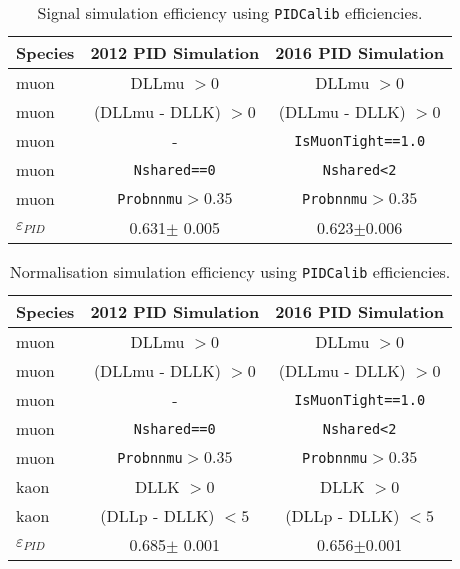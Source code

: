 \begin{table}[H]
\begin{center}
\begin{tabular}{l c c}\toprule

    Species  & 2012 PID Simulation & 2016 PID Simulation\\ \hline
    muon &  DLLmu $ > 0$ & DLLmu $ > 0$ \\
    muon &  (DLLmu - DLLK) $ > 0$ & (DLLmu - DLLK) $ > 0$ \\
    muon &   - & \texttt{IsMuonTight==1.0}\\
    muon &  \texttt{Nshared==0} & \texttt{Nshared<2} \\
	muon &  \texttt{Probnnmu}$>0.35$ & \texttt{Probnnmu}$>0.35$ \\
     \hline
   $\varepsilon_{PID}$   & 0.631$\pm$ 0.005 & 0.623$\pm$0.006 \\

     \bottomrule
      \end{tabular}
\end{center}
\caption{Signal simulation efficiency using \texttt{PIDCalib} efficiencies.}
\label{tab:PIDselection}
\end{table}

\begin{table}[H]
\begin{center}
\begin{tabular}{l c c}\toprule

    Species  &2012 PID Simulation & 2016 PID Simulation\\ \hline
    muon &  DLLmu $ > 0$ & DLLmu $ > 0$ \\
    muon &  (DLLmu - DLLK) $ > 0$ & (DLLmu - DLLK) $ > 0$ \\
    muon &  - & \texttt{IsMuonTight==1.0}\\
    muon & \texttt{Nshared==0} & \texttt{Nshared<2} \\
    muon & \texttt{Probnnmu}$>0.35$ & \texttt{Probnnmu}$>0.35$ \\
    kaon &  DLLK $ > 0$ & DLLK $ > 0$ \\
    kaon &  (DLLp - DLLK) $ < 5$ & (DLLp - DLLK) $< 5$ \\
     \hline
    $\varepsilon_{PID}$ &0.685$\pm$ 0.001 & 0.656$\pm$0.001  \\

     \bottomrule
      \end{tabular}

\end{center}
\caption{Normalisation simulation efficiency using \texttt{PIDCalib} efficiencies.}
\label{tab:PIDselectionNorm}
\end{table}


